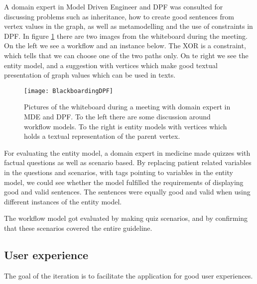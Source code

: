 A domain expert in Model Driven Engineer and DPF was consulted for discussing problems such as inheritance, how to create good sentences from vertex values in the graph, as well as metamodelling and the use of constraints in DPF. In figure \ref{fig:BlackboardingDPF} there are two images from the whiteboard during the meeting. On the left we see a workflow and an instance below. The XOR is a constraint, which tells that we can choose one of the two  paths only. On te right we see the entity model, and a suggestion with vertices which make good textual presentation of graph values which can be used in texts. 
\begin{figure}[h!]
	\caption {Pictures of the whiteboard during a meeting with domain expert in MDE and DPF. To the left there are some discussion around workflow models. To the right is entity models with vertices which holds a textual representation of the parent vertex.   }
	\label{fig:BlackboardingDPF}
	\texttt{[image: BlackboardingDPF]}
\end{figure}

For evaluating the entity model, a domain expert in medicine made quizzes with factual questions as well as scenario based. By replacing patient related variables in the questions and scenarios, with tags pointing to variables in the entity model, we could see whether the model fulfilled the requirements of displaying good and valid sentences. The sentences were equally good and valid when using different instances of the entity model.

The workflow model got evaluated by making quiz scenarios, and by confirming that these scenarios covered the entire guideline.



 
\subsection{User experience}
The goal of the iteration is to facilitate the application for good user experiences.

